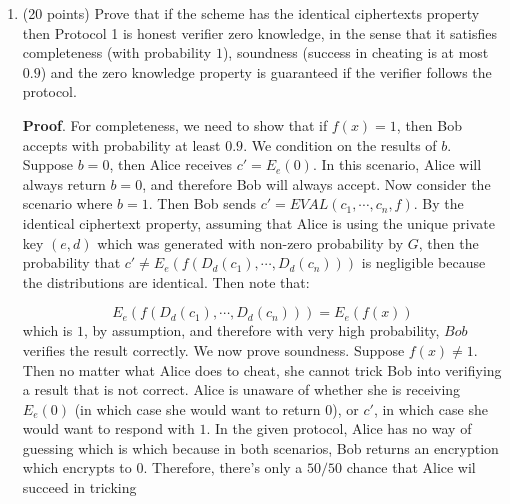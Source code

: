 \documentclass{article}
\begin{document}
\begin{enumerate}
\begin{itemize}
\begin{enumerate}[noitemsep,topsep=\mdcompacttopsep,label=\alph*.]
\item{}(20 points) Prove that if the scheme has the identical ciphertexts property then Protocol 1 is honest verifier zero knowledge, in the sense that it satisfies completeness (with probability $1$), soundness (success in cheating is at most $0.9$) and the zero knowledge property is guaranteed if the verifier follows the protocol.

\begin{mdbmarginx}{1ex}{0pt}{1ex}{0pt}%
\noindent{}\textbf{Proof}.  For completeness, we need to show that if $f(x) = 1$, then Bob accepts with probability at least
$0.9$. We condition on the results of $b$. Suppose $b = 0$, then Alice receives $c' = E_e(0)$. 
In this scenario, Alice will always return $b = 0$, and therefore Bob will always accept. Now
consider the scenario where $b = 1$. Then Bob sends $c' = EVAL(c_1, \cdots, c_n, f)$. By the
identical ciphertext property, assuming that Alice is using the unique private key $(e,d)$ which
was generated with non-zero probability by $G$, then the probability that $c' \neq E_e(f(D_d(c_1),\cdots,D_d(c_n)))$ is 
negligible because the distributions are identical. Then note that:%
\end{mdbmarginx}%
\noindent\noindent\[%
E_e(f(D_d(c_1),\cdots,D_d(c_n))) = E_e(f(x))
\]%
which is $1$, by assumption, and therefore with very high probability, $Bob$ verifies the result
correctly. 
We now prove soundness. Suppose $f(x) \neq 1$. Then no matter what Alice does to cheat, she
cannot trick Bob into verifiying a result that is not correct. Alice is unaware of whether 
she is receiving $E_e(0)$ (in which case she would want to return $0$), or $c'$,
in which case she would want to respond with $1$. In the given protocol, Alice has no 
way of guessing which is which because in both scenarios, Bob returns an encryption which
encrypts to $0$. Therefore, there's only a $50/50$ chance that Alice wil succeed in tricking

\end{enumerate}
\end{itemize}
\end{enumerate}
\end{document}
